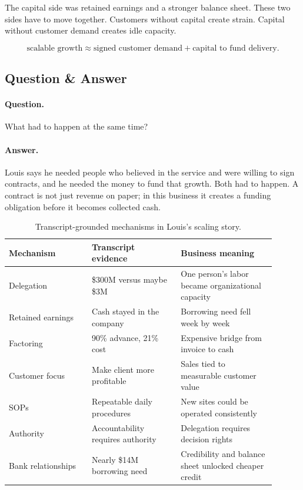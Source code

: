 The capital side was retained earnings and a stronger balance sheet. These two sides have to move together. Customers without capital create strain. Capital without customer demand creates idle capacity.

\begin{equation}
\text{scalable growth}
\approx
\text{signed customer demand}
+
\text{capital to fund delivery}.
\end{equation}

\subsection{Question \& Answer}

\paragraph{Question.} What had to happen at the same time?

\paragraph{Answer.} Louis says he needed people who believed in the service and were willing to sign contracts, and he needed the money to fund that growth. Both had to happen. A contract is not just revenue on paper; in this business it creates a funding obligation before it becomes collected cash.

\begin{table}
\centering
\begin{tabular}{p{0.28\linewidth} p{0.30\linewidth} p{0.32\linewidth}}
\hline
Mechanism & Transcript evidence & Business meaning \\
\hline
Delegation & \$300M versus maybe \$3M & One person's labor became organizational capacity \\
Retained earnings & Cash stayed in the company & Borrowing need fell week by week \\
Factoring & 90\% advance, 21\% cost & Expensive bridge from invoice to cash \\
Customer focus & Make client more profitable & Sales tied to measurable customer value \\
SOPs & Repeatable daily procedures & New sites could be operated consistently \\
Authority & Accountability requires authority & Delegation requires decision rights \\
Bank relationships & Nearly \$14M borrowing need & Credibility and balance sheet unlocked cheaper credit \\
\hline
\end{tabular}
\caption{Transcript-grounded mechanisms in Louis's scaling story.}
\end{table}

